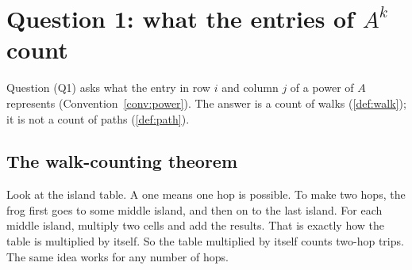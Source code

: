 \section{Question 1: what the entries of \texorpdfstring{$A^k$}{A\^{}k} count}\label{sec:counting}

Question (Q1) asks what the entry in row $i$ and column $j$ of a power of
$A$ represents (Convention~\ref{conv:power}). The answer is a count of
walks (\cref{def:walk}); it is not a count of paths (\cref{def:path}).

\subsection{The walk-counting theorem}

\plainwords{} Look at the island table. A one means one hop is possible.
To make two hops, the frog first goes to some middle island, and then on
to the last island. For each middle island, multiply two cells and add the
results. That is exactly how the table is multiplied by itself. So the
table multiplied by itself counts two-hop trips. The same idea works for
any number of hops.

